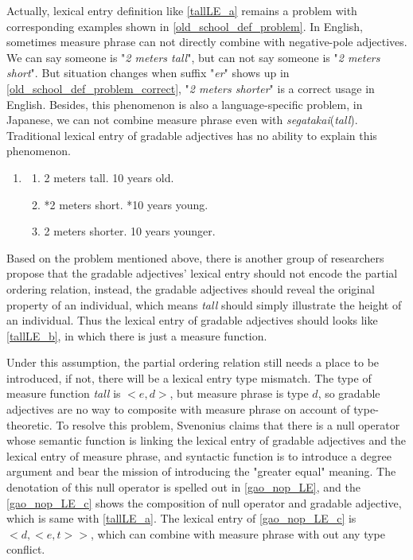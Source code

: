\documentclass{ctexart}
\let \cite \parencite
\begin{document}
Actually, lexical entry definition like \ref{tallLE_a} remains a problem with corresponding examples shown in \ref{old_school_def_problem}. In English, sometimes measure phrase can not directly combine with negative-pole adjectives. We can say someone is "\textit{2 meters tall}", but can not say someone is "\textit{2 meters short}". But situation changes when suffix "\textit{er}" shows up in \ref{old_school_def_problem_correct}, "\textit{2 meters shorter}" is a correct usage in English. Besides, this phenomenon is also a language-specific problem, in Japanese, we can not combine measure phrase even with \textit{segatakai}(\textit{tall}). Traditional lexical entry of gradable adjectives has no ability to explain this phenomenon.

\begin{enumerate}[resume]

    \item \label{old_school_def_problem}
    
    \begin{enumerate}[ref=(\arabic{enumi}\alph*)]
        
        \item 2 meters tall. 10 years old.
        \item *2 meters short. *10 years young.
        \item \label{old_school_def_problem_correct} 2 meters shorter. 10 years younger.

    \end{enumerate}

\end{enumerate}

Based on the problem mentioned above, there is another group of researchers propose that the gradable adjectives' lexical entry should not encode the partial ordering relation, instead, the gradable adjectives should reveal the original property of an individual, which means \textit{tall} should simply illustrate the height of an individual. Thus the lexical entry of gradable adjectives should looks like \ref{tallLE_b}, in which there is just a measure function. 

Under this assumption, the partial ordering relation still needs a place to be introduced, if not, there will be a lexical entry type mismatch. The type of measure function \textit{tall} is $<e,d>$, but measure phrase is type $d$, so gradable adjectives are no way to composite with measure phrase on account of type-theoretic. To resolve this problem, Svenonius\cite{svenonius2006} claims that there is a null operator whose semantic function is linking the lexical entry of gradable adjectives and the lexical entry of measure phrase, and syntactic function is to introduce a degree argument and bear the mission of introducing the "greater equal" meaning. The denotation of this null operator is spelled out in \ref{gao_nop_LE}, and the \ref{gao_nop_LE_c} shows the composition of null operator and gradable adjective, which is same with \ref{tallLE_a}. The lexical entry of \ref{gao_nop_LE_c} is $<d,<e,t>>$, which can combine with measure phrase with out any type conflict.
\end{document}
